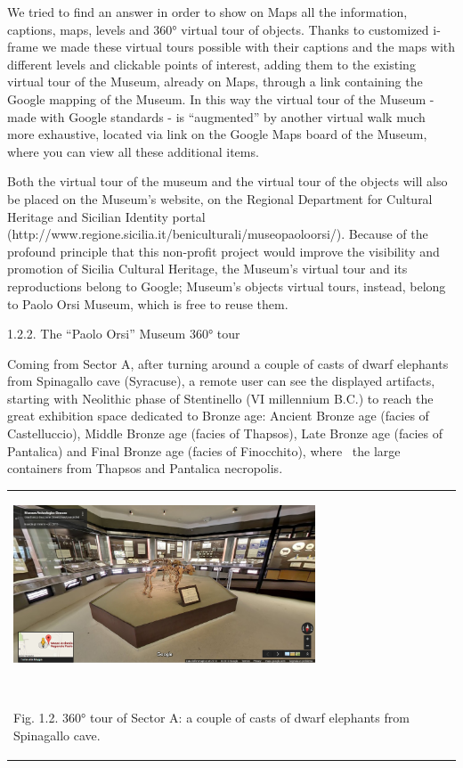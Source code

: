 \documentclass[amsthm,ebook]{saparticle}
\begin{document}
We tried to find an answer in order to show on Maps all the information, captions, maps, levels and 360° virtual tour of
objects. Thanks to customized i-frame we made these virtual tours possible with their captions and the maps with
different levels and clickable points of interest, adding them to the existing virtual tour of the Museum, already on
Maps, through a link containing the Google mapping of the Museum. In this way the virtual tour of the Museum - made
with Google standards - is “augmented” by another virtual walk much more exhaustive, located via link on the Google
Maps board of the Museum, where you can view all these additional items.

Both the virtual tour of the museum and the virtual tour of the objects will also be placed on the Museum's website, on
the Regional Department for Cultural Heritage and Sicilian Identity portal
(http://www.regione.sicilia.it/beniculturali/museopaoloorsi/). Because of the profound principle that this non-profit
project would improve the visibility and promotion of Sicilia Cultural Heritage, the Museum’s virtual tour and its
reproductions belong to Google; Museum’s objects virtual tours, instead, belong to Paolo Orsi Museum, which is free to
reuse them. 


\bigskip

1.2.2. The “Paolo Orsi” Museum 360° tour

Coming from Sector A, after turning around a couple of casts of dwarf elephants from Spinagallo cave (Syracuse), a
remote user can see the displayed artifacts, starting with Neolithic phase of Stentinello (VI millennium B.C.) to reach
the great exhibition space dedicated to Bronze age: Ancient Bronze age (facies of Castelluccio), Middle Bronze age
(facies of Thapsos), Late Bronze age (facies of Pantalica) and Final Bronze age (facies of Finocchito), where \ the
large containers from Thapsos and Pantalica necropolis.

\begin{flushleft}
\tablefirsthead{}
\tablehead{}
\tabletail{}
\tablelasttail{}
\begin{supertabular}{m{10.681cm}}
{\centering  \includegraphics[width=8.98cm,height=4.697cm]{EAGLE2016BONACINIPilotprojectatPaoloOrsiMuseum-img002.jpg}
\par}

~

Fig. 1.2. 360° tour of Sector A: a couple of casts of dwarf elephants from Spinagallo cave. \\
\end{supertabular}
\end{flushleft}
\end{document}

